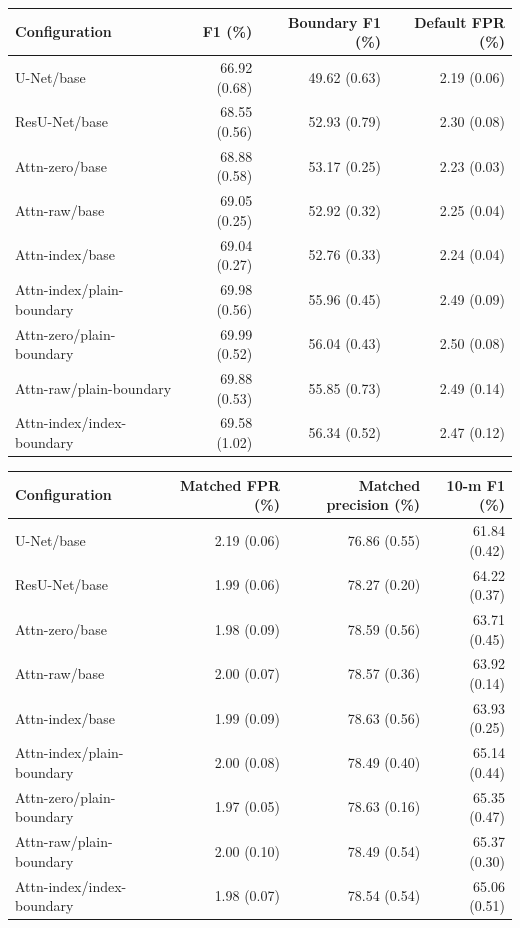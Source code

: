 \footnotesize
\setlength{\tabcolsep}{5pt}
\begin{tabular}{@{}lrrr@{}}
\toprule
Configuration & F1 (\%) & Boundary F1 (\%) & Default FPR (\%) \\
\midrule
U-Net/base & 66.92 (0.68) & 49.62 (0.63) & 2.19 (0.06) \\
ResU-Net/base & 68.55 (0.56) & 52.93 (0.79) & 2.30 (0.08) \\
Attn-zero/base & 68.88 (0.58) & 53.17 (0.25) & 2.23 (0.03) \\
Attn-raw/base & 69.05 (0.25) & 52.92 (0.32) & 2.25 (0.04) \\
Attn-index/base & 69.04 (0.27) & 52.76 (0.33) & 2.24 (0.04) \\
Attn-index/plain-boundary & 69.98 (0.56) & 55.96 (0.45) & 2.49 (0.09) \\
Attn-zero/plain-boundary & 69.99 (0.52) & 56.04 (0.43) & 2.50 (0.08) \\
Attn-raw/plain-boundary & 69.88 (0.53) & 55.85 (0.73) & 2.49 (0.14) \\
Attn-index/index-boundary & 69.58 (1.02) & 56.34 (0.52) & 2.47 (0.12) \\
\bottomrule
\end{tabular}
\par\vspace{0.6em}
\begin{tabular}{@{}lrrr@{}}
\toprule
Configuration & Matched FPR (\%) & Matched precision (\%) & 10-m F1 (\%) \\
\midrule
U-Net/base & 2.19 (0.06) & 76.86 (0.55) & 61.84 (0.42) \\
ResU-Net/base & 1.99 (0.06) & 78.27 (0.20) & 64.22 (0.37) \\
Attn-zero/base & 1.98 (0.09) & 78.59 (0.56) & 63.71 (0.45) \\
Attn-raw/base & 2.00 (0.07) & 78.57 (0.36) & 63.92 (0.14) \\
Attn-index/base & 1.99 (0.09) & 78.63 (0.56) & 63.93 (0.25) \\
Attn-index/plain-boundary & 2.00 (0.08) & 78.49 (0.40) & 65.14 (0.44) \\
Attn-zero/plain-boundary & 1.97 (0.05) & 78.63 (0.16) & 65.35 (0.47) \\
Attn-raw/plain-boundary & 2.00 (0.10) & 78.49 (0.54) & 65.37 (0.30) \\
Attn-index/index-boundary & 1.98 (0.07) & 78.54 (0.54) & 65.06 (0.51) \\
\bottomrule
\end{tabular}
